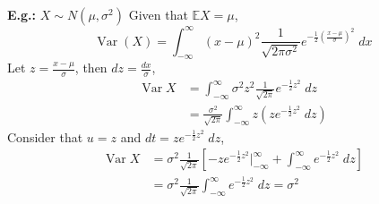 \documentclass[a4paper]{article}
\newcommand{\n}{\hfill\break}
\newcommand{\eg}[1]{\par\noindent\settowidth{\hangindent}{\textbf{E.g.: }}\textbf{E.g.: }#1\n}
\newcommand{\Avg}{\mathbb{E}}
\newcommand{\E}{\Avg}
\DeclareMathOperator{\Var}{Var}
\begin{document}
\eg{$X\sim N(\mu, \sigma^2)$
Given that $\E X=\mu$,
\[\Var(X)=\int^\infty_{-\infty} (x-\mu)^2 \frac{1}{\sqrt{2\pi\sigma^2}}e^{-\frac{1}{2}\left(\frac{x-\mu}{\sigma}\right)^2}\;dx\]
Let $z=\frac{x-\mu}{\sigma}$, then $dz=\frac{dx}{\sigma}$,
\begin{align*}
    \Var X&=\int^\infty_{-\infty}\sigma^2 z^2\frac{1}{\sqrt{2\pi}}e^{-\frac{1}{2}z^2}\;dz \\
    &= \frac{\sigma^2}{\sqrt{2\pi}}\int^\infty_{-\infty}z\left(ze^{-\frac{1}{2}z^2}\;dz\right)
\end{align*}
Consider that $u=z$ and $dt=ze^{-\frac{1}{2}z^2}\;dz$,
\begin{align*}
    \Var X&=\sigma^2\frac{1}{\sqrt{2\pi}}\left[-ze^{-\frac{1}{2}z^2}\bigg\vert^\infty_{-\infty}+\int_{-\infty}^\infty e^{-\frac{1}{2}z^2}\;dz\right] \\
    &=\sigma^2\frac{1}{\sqrt{2\pi}}\int_{-\infty}^\infty e^{-\frac{1}{2}z^2}\;dz=\sigma^2
\end{align*}
}
\end{document}
